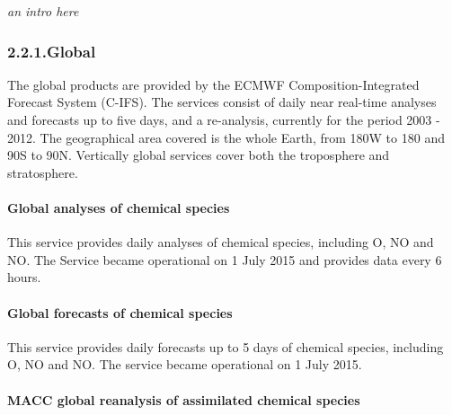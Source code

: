 \documentclass[9pt]{article}
\begin{document}
\noindent{}\emph{an intro here}%

\subsubsection{2.2.1.\hspace*{0.5em}Global}\label{sec-global}%

\noindent{}The global products are provided by the ECMWF Composition-Integrated Forecast System (C-IFS).
The services consist of daily near real-time analyses and forecasts up to five days, and a re-analysis, currently for the period 2003 - 2012. 
The geographical area covered is the whole Earth, from 180\textdegree{}W to 180\textdegree{} and 90\textdegree{}S to 90\textdegree{}N. 
Vertically global services cover both the troposphere and stratosphere.%

\paragraph{Global analyses of chemical species}\label{sec-global-analyses-of-chemical-species}%

\noindent{}This service provides daily analyses of chemical species, including O, NO and NO. 
The Service became operational on 1 July 2015 and provides data every 6 hours.%

\paragraph{Global forecasts of chemical species}\label{sec-global-forecasts-of-chemical-species}%

\noindent{}This service provides daily forecasts up to 5 days of chemical species, including O, NO and NO. 
The service became operational on 1 July 2015.%

\paragraph{MACC global reanalysis of assimilated chemical species}\label{sec-macc-global-reanalysis-of-assimilated-chemical-species}%
\end{document}
